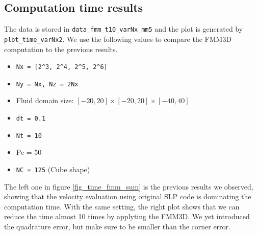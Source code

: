 \subsection{Computation time results}
The data is stored in \verb+data_fmm_t10_varNx_mm5+ and the plot is generated by \verb+plot_time_varNx2+. We use the following values to compare the FMM3D computation to the previous results.
\begin{framed}
	\begin{itemize}
	\item \verb+Nx = [2^3, 2^4, 2^5, 2^6]+
	\item \verb+Ny = Nx, Nz = 2Nx+
	\item Fluid domain size: $[-20, 20] \times [-20, 20] \times [-40, 40]$
	\item \verb+dt = 0.1+
	\item \verb+Nt = 10+
	\item Pe = 50
	\item \verb+NC = 125+ (Cube shape)
	\end{itemize}
\end{framed}
The left one in figure \ref{fig_time_fmm_sum} is the previous results we observed, showing that the velocity evaluation using original SLP code is dominating the computation time. With the same setting, the right plot shows that we can reduce the time almost 10 times by applyting the FMM3D. We yet introduced the quadrature error, but make sure to be smaller than the corner error. 
